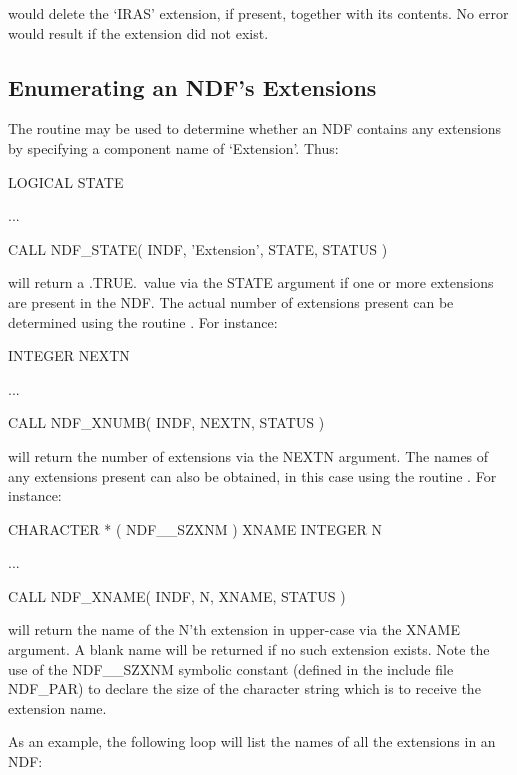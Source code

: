 \documentclass[twoside,11pt,nolof]{starlink}
\begin{document}
would delete the `IRAS' extension, if present, together with its contents.
No error would result if the extension did not exist.

\subsection{Enumerating an NDF's Extensions}

The routine  may be used to determine whether an NDF contains any
extensions by specifying a component name of `Extension'.
Thus:

\small
\begin{terminalv}
      LOGICAL STATE

      ...

      CALL NDF_STATE( INDF, 'Extension', STATE, STATUS )
\end{terminalv}
\normalsize

will return a .TRUE.\ value via the STATE argument if one or more extensions
are present in the NDF.
The actual number of extensions present can be determined using the routine
.
For instance:

\small
\begin{terminalv}
      INTEGER NEXTN

      ...

      CALL NDF_XNUMB( INDF, NEXTN, STATUS )
\end{terminalv}
\normalsize

will return the number of extensions via the NEXTN argument.
The names of any extensions present can also be obtained, in this case
using the routine .
For instance:

\small
\begin{terminalv}
      CHARACTER * ( NDF__SZXNM ) XNAME
      INTEGER N

      ...

      CALL NDF_XNAME( INDF, N, XNAME, STATUS )
\end{terminalv}
\normalsize

will return the name of the N'th extension in upper-case via the XNAME
argument.
A blank name will be returned if no such extension exists.
Note the use of the NDF\_\_SZXNM symbolic constant (defined in the include
file NDF\_PAR) to declare the size of the character string which is to
receive the extension name.

As an example, the following loop will list the names of all the extensions
in an NDF:
\end{document}
